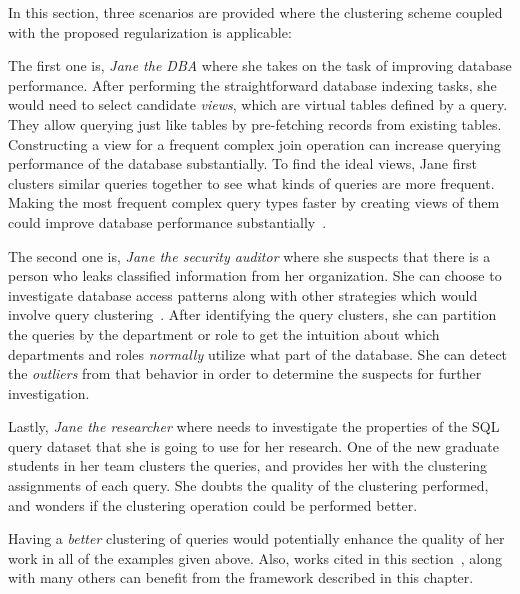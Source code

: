 In this section, three scenarios are provided where the clustering scheme coupled with the proposed regularization is applicable:

The first one is, \textit{Jane the DBA} where she takes on the task of improving database performance.
After performing the straightforward database indexing tasks, she would need to select candidate \textit{views}, which are virtual tables defined by a query.
They allow querying just like tables by pre-fetching records from existing tables. 
Constructing a view for a frequent complex join operation can increase querying performance of the database substantially.
To find the ideal views, Jane first clusters similar queries together to see what kinds of queries are more frequent.
Making the most frequent complex query types faster by creating views of them could improve database performance substantially~\cite{aouiche2006, aligon2014similarity}. 

The second one is, \textit{Jane the security auditor} where she suspects that there is a person who leaks classified information from her organization.
She can choose to investigate database access patterns along with other strategies which would involve query clustering~\cite{Sun2016}.
After identifying the query clusters, she can partition the queries by the department or role to get the intuition about which departments and roles \textit{normally} utilize what part of the database.
She can detect the \textit{outliers} from that behavior in order to determine the suspects for further investigation.

Lastly, \textit{Jane the researcher} where needs to investigate the properties of the SQL query dataset that she is going to use for her research.
One of the new graduate students in her team clusters the queries, and provides her with the clustering assignments of each query.
She doubts the quality of the clustering performed, and wonders if the clustering operation could be performed better.

Having a \textit{better} clustering of queries would potentially enhance the quality of her work in all of the examples given above.
Also, works cited in this section~\cite{aouiche2006, aligon2014similarity, Sun2016}, along with many others can benefit from the framework described in this chapter.
